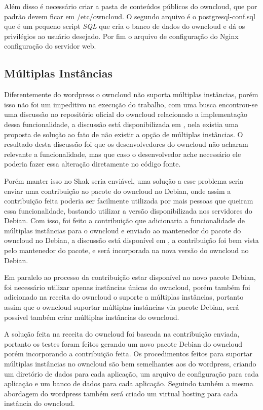 Além disso é necessário criar a pasta de conteúdos públicos do owncloud, que por
padrão devem ficar em /etc/owncloud. O segundo arquivo é o postgresql-conf.sql
que é um pequeno script \textit{SQL} que cria o banco de dados do owncloud e dá os
privilégios ao usuário desejado. Por fim o arquivo de configuração do Nginx
configuração do servidor web.

\subsection{Múltiplas Instâncias}

Diferentemente do wordpress o owncloud não suporta múltiplas instâncias, porém isso
não foi um impeditivo na execução do trabalho, com uma busca encontrou-se uma discussão no repositório
oficial do owncloud relacionado a implementação dessa funcionalidade, a discussão está
disponibilizada em \href{https://github.com/owncloud/core/pull/16424}, nela existia
uma proposta de solução ao fato de não existir a opção de múltiplas instâncias. O
resultado desta discussão foi que os desenvolvedores do owncloud não acharam relevante
a funcionalidade, mas que caso o desenvolvedor ache necessário ele poderia fazer essa
alteração diretamente no código fonte.

Porém manter isso no Shak seria enviável, uma solução a esse problema seria enviar
uma contribuição ao pacote do owncloud no Debian, onde assim a contribuição feita
poderia ser facilmente utilizada por mais pessoas que queiram essa funcionalidade,
bastando utilizar a versão disponibilizada nos servidores do Debian. Com isso, foi
feito a contribuição que adicionaria a funcionalidade de múltiplas instâncias para
o owncloud e enviado ao mantenedor do pacote do owncloud no Debian,
a discussão está disponível em \href{https://bugs.debian.org/cgi-bin/bugreport.cgi?bug=789726},
a contribuição foi bem vista pelo mantenedor do pacote, e será incorporada na nova
versão do owncloud no Debian.

Em paralelo ao processo da contribuição estar disponível no novo pacote Debian,
foi necessário utilizar apenas instâncias únicas do owncloud, porém também foi
adicionado na receita do owncloud o suporte a múltiplas instâncias, portanto
assim que o owncloud suportar múltiplas instâncias via pacote Debian, será possível
também criar múltiplas instâncias do owncloud.

A solução feita na receita do owncloud foi baseada na contribuição enviada, portanto
os testes foram feitos gerando um novo pacote Debian do owncloud porém incorporando
a contribuição feita. Os procedimentos feitos para suportar múltiplas instâncias
no owncloud são bem semelhantes aos do wordpress, criando um diretório de dados
para cada aplicação, um arquivo de configuração para cada aplicação e um banco de
dados para cada aplicação. Seguindo também a mesma abordagem do wordpress também
será criado um virtual hosting para cada instância do owncloud.

